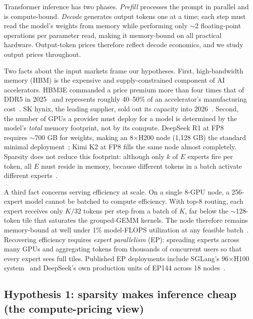 \documentclass[11pt]{article}
\begin{document}
Transformer inference has two phases. \emph{Prefill} processes the prompt in
parallel and is compute-bound. \emph{Decode} generates output tokens one at a
time; each step must read the model's weights from memory while performing
only $\sim$2 floating-point operations per parameter read, making it
memory-bound on all practical hardware. Output-token prices therefore reflect
decode economics, and we study output prices throughout.

Two facts about the input markets frame our hypotheses. First, high-bandwidth memory (HBM) is the expensive and supply-constrained component of AI accelerators. HBM3E commanded a price premium more than four times that of DDR5 in 2025~\cite{r4} and represents roughly 40--50\% of an accelerator's manufacturing cost~\cite{r5}. SK hynix, the leading supplier, sold out its capacity into 2026~\cite{r6}. Second, the number of GPUs a provider must deploy for a model is determined by the model's \emph{total} memory footprint, not by its compute. DeepSeek R1 at FP8 requires $\sim$700 GB for weights, making an 8$\times$H200 node (1{,}128 GB) the standard minimal deployment~\cite{r17}; Kimi K2 at FP8 fills the same node almost completely.
Sparsity does not reduce this footprint: although only $k$ of $E$ experts fire
per token, all $E$ must reside in memory, because different tokens in a batch
activate different experts~\cite{r7}.

A third fact concerns serving efficiency at scale. On a single 8-GPU node, a
256-expert model cannot be batched to compute efficiency. With top-8 routing, each expert receives only $K/32$ tokens per step from a batch of $K$, far below the $\sim$128-token tile that saturates the grouped-GEMM kernels. The node therefore remains memory-bound at well under 1\% model-FLOPS utilization at any feasible batch~\cite{r9,r16}. Recovering efficiency requires \emph{expert
parallelism} (EP): spreading experts across many GPUs and aggregating tokens
from thousands of concurrent users so that every expert sees full tiles.
Published EP deployments include SGLang's 96$\times$H100 system~\cite{r8} and
DeepSeek's own production units of EP144 across 18 nodes~\cite{r10}.

\subsection{Hypothesis 1: sparsity makes inference cheap (the compute-pricing view)}
\label{sec:h1}
\end{document}
